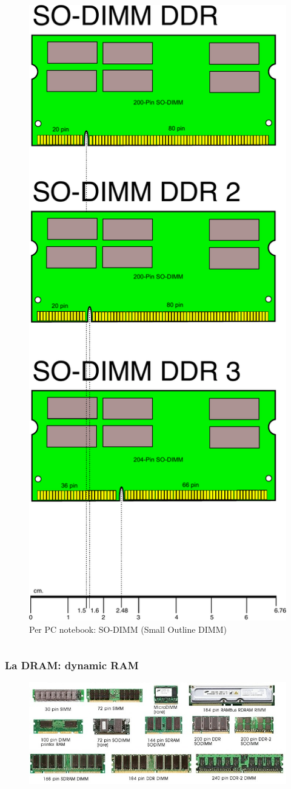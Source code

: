 \begin{frame}
\begin{columns}
		\begin{figure}[!htbp]
			\centering 
			\includegraphics[width=0.4\linewidth]{images/5_memory/so_dimm.pdf}
			\caption{Per PC notebook: \protect\linebreak SO-DIMM (Small Outline DIMM)}
			\label{fig:memory_so_dimm}
		\end{figure}
	\end{columns}
	
\end{frame}




\begin{frame}
	\frametitle{La DRAM: dynamic RAM}
	 
	\begin{figure}[!htbp] 
		\centering
		\includegraphics[width=1.0\linewidth]{images/5_memory/ram_types.jpeg}
	\end{figure}
	
\end{frame}






